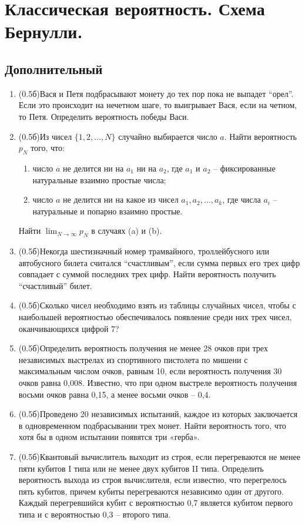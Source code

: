 \documentclass[a4paper, 14pt]{extarticle}
\begin{document}
\newpage

\section*{Классическая вероятность. Схема Бернулли.}
\subsection*{Дополнительный}
\begin{enumerate}
\item (0.5б)Вася и Петя подбрасывают монету до тех пор пока не выпадет ``орел''. Если это происходит на нечетном шаге, то выигрывает Вася, если на четном, то Петя. Определить вероятность победы Васи.

	\item (0.5б)Из чисел $\{1, 2, \ldots, N\}$ случайно выбирается
		число $a$. Найти вероятность $p_N$ того, что: 
		\begin{enumerate}
		    \item число $a$
		не делится ни на $a_1$ ни на $a_2$, где $a_1$ и 
		$a_2$ -- фиксированные натуральные взаимно простые числа;
		\item число $a$
		не делится ни на какое из чисел $a_1, a_2, \ldots, a_k$, где
		числа $a_i$ -- натуральные и попарно взаимно простые.
		\end{enumerate}
		Найти $\lim_{N\rightarrow\infty} p_N$ в случаях (a) и (b).
	\item (0.5б)Некогда  шестизначный номер
	трамвайного, троллейбусного или автобусного билета
	считался ``счастливым'', если сумма первых его трех
	цифр совпадает с суммой последних трех цифр. Найти
	вероятность получить ``счастливый'' билет.
    \item (0.5б)Сколько чисел необходимо взять из таблицы 
	случайных чисел, чтобы с наибольшей вероятностью обеспечивалось
	появление среди них трех чисел, оканчивающихся цифрой 7?
	\item (0.5б)Определить вероятность получения не менее 28 
	очков при трех независимых выстрелах из спортивного 
	пистолета по мишени с максимальным числом очков, равным 10,
	если вероятность получения 30 очков равна 0,008. Известно,
	что при одном выстреле вероятность получения восьми очков
	равна 0,15, а менее восьми очков -- 0,4.
\item (0.5б)Проведено 20 независимых испытаний, каждое
	из которых заключается в одновременном 
	подбрасывании трех монет. Найти вероятность того, что хотя
	бы в одном испытании появятся три «герба».
    \item (0.5б)Квантовый вычислитель  выходит из строя, если перегреваются не менее пяти кубитов I типа или не менее двух кубитов II типа. Определить
	вероятность выхода из строя вычислителя, если известно, что 
	перегрелось пять кубитов, причем кубиты перегреваются независимо один
	от другого. Каждый перегревшийся кубит с вероятностью 0,7
	является кубитом первого типа и с вероятностью 0,3 -- второго
	типа.
\end{enumerate}
\end{document}
